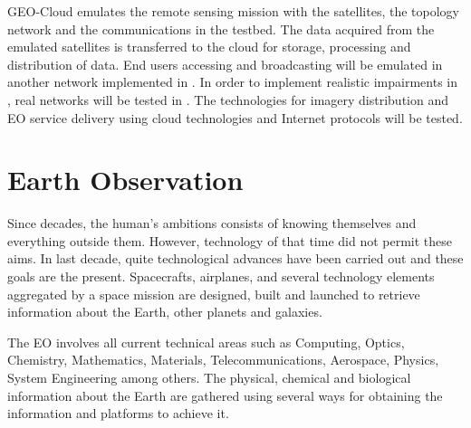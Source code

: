 GEO-Cloud  emulates the remote sensing mission with the satellites, the
topology network and the communications in the \vw testbed. The data
acquired from the emulated satellites is transferred to the \bonfire cloud
for storage, processing and distribution of data. End users accessing and
broadcasting will be emulated in another network implemented in \vw. In
order to implement realistic impairments in \vw, real networks will be
tested in \pl.  The technologies for imagery distribution and \ac{EO}
service delivery using cloud technologies and Internet protocols will be tested.

\section{Earth Observation}

Since decades, the human's ambitions consists of knowing themselves and
everything outside them. However, technology of that time did not permit these
aims. In last decade, quite technological advances have been carried out and
these goals are the present. Spacecrafts, airplanes, and several technology
elements aggregated by a space mission are designed, built and launched to
retrieve information about the Earth, other planets and galaxies.

The \ac{EO} involves all current technical areas such as Computing, Optics,
Chemistry, Mathematics, Materials, Telecommunications, Aerospace, Physics,
System Engineering among others. The physical, chemical and biological
information about the Earth are gathered using several ways for obtaining the
information and platforms to achieve it.   

